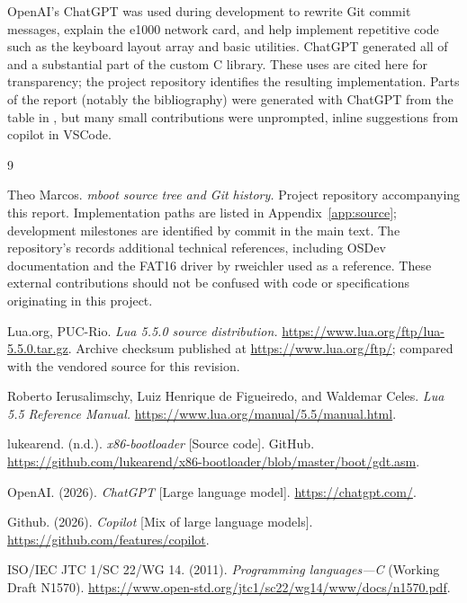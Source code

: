 \documentclass[11pt,a4paper]{scrartcl}
\newcommand{\code}[1]{\texttt{\detokenize{#1}}}
\begin{document}
OpenAI's ChatGPT was used during development to rewrite Git commit messages,
explain the e1000 network card, and help implement repetitive code such as
the keyboard layout array and basic utilities. ChatGPT generated all of
\code{math.h} and a substantial part of the custom C library. These uses
are cited here for transparency; the project repository identifies the
resulting implementation. \cite{openai-ai} Parts of the report (notably the bibliography)
were generated with ChatGPT from the table in \code{SOURCES.md}, but many
small contributions were unprompted, inline suggestions from copilot in VSCode. \cite{gh-cop}

\clearpage
\begin{thebibliography}{9}

Theo Marcos. \emph{mboot source tree and Git history.}
Project repository accompanying this report. Implementation paths are
listed in Appendix~\ref{app:source}; development milestones are identified by commit in
the main text. The repository's \code{SOURCES.md} records additional
technical references, including OSDev documentation and the FAT16 driver
by rweichler used as a reference. These external contributions should not
be confused with code or specifications originating in this project.

Lua.org, PUC-Rio. \emph{Lua 5.5.0 source distribution.}
\url{https://www.lua.org/ftp/lua-5.5.0.tar.gz}.
Archive checksum published at \url{https://www.lua.org/ftp/}; compared
with the vendored source for this revision.

Roberto Ierusalimschy, Luiz Henrique de Figueiredo, and Waldemar Celes.
\emph{Lua 5.5 Reference Manual.}
\url{https://www.lua.org/manual/5.5/manual.html}.

lukearend. (n.d.). \emph{x86-bootloader} [Source code]. GitHub.
\url{https://github.com/lukearend/x86-bootloader/blob/master/boot/gdt.asm}.

OpenAI. (2026). \emph{ChatGPT} [Large language model].
\url{https://chatgpt.com/}.

Github. (2026). \emph{Copilot} [Mix of large language models].
\url{https://github.com/features/copilot}.

ISO/IEC JTC 1/SC 22/WG 14. (2011). \emph{Programming languages---C}
(Working Draft N1570). \url{https://www.open-std.org/jtc1/sc22/wg14/www/docs/n1570.pdf}.


\end{thebibliography}
\end{document}
